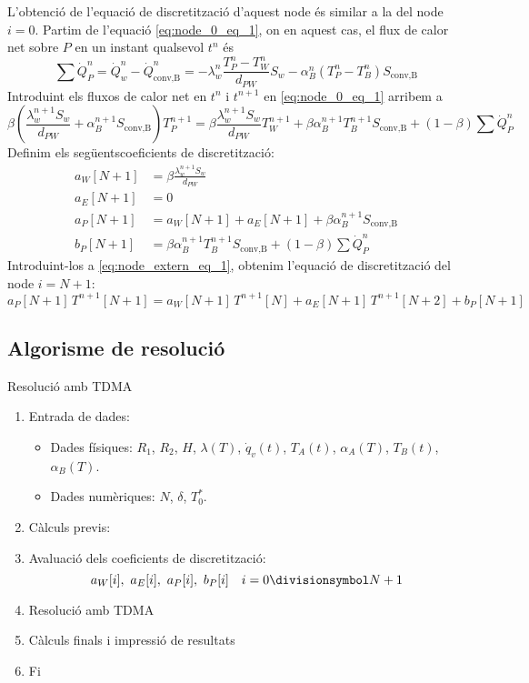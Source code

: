 L'obtenció de l'equació de discretització d'aquest node és similar a la del node $i = 0$. Partim de l'equació \eqref{eq:node_0_eq_1}, on en aquest cas, el flux de calor net sobre $P$ en un instant qualsevol $t^n$ és
\begin{equation} \label{eq:node_extern_fluxe_calor}
	\sum \dot{Q}_P^n = 
	\dot{Q}_w^n - \dot{Q}_\text{conv,B}^n = 
	-\lambda_w^n \frac{T_P^n - T_W^n}{d_{PW}} S_w - \alpha_B^n \left( T_P^n - T_B^n \right) S_\text{conv,B}
\end{equation}
Introduint els fluxos de calor net en $t^{n}$ i $t^{n+1}$ en \eqref{eq:node_0_eq_1} arribem a
\begin{equation} \label{eq:node_extern_eq_1}
	\beta \left(\frac{\lambda_w^{n+1} S_w}{d_{PW}} + \alpha_B^{n+1} S_\text{conv,B} \right) T_P^{n+1} = 
	\beta \frac{\lambda_w^{n+1} S_w}{d_{PW}} T_W^{n+1} + 
	\beta \alpha_B^{n+1} T_B^{n+1} S_\text{conv,B} + 
	(1 - \beta) \sum \dot{Q}_P^n
\end{equation}
Definim els següentscoeficients de discretització:
\begin{align} 
	a_W[N+1] &= \beta \frac{\lambda_w^{n+1} S_w}{d_{PW}} 					\\
	a_E[N+1] &= 0 															\\
	a_P[N+1] &= a_W[N+1] + a_E[N+1] + \beta \alpha_B^{n+1} S_\text{conv,B}	\\
	b_P[N+1] &= \beta \alpha_B^{n+1} T_B^{n+1} S_\text{conv,B} + (1 - \beta) \sum \dot{Q}_P^n
\end{align}
Introduint-los a \ref{eq:node_extern_eq_1}, obtenim l'equació de discretització del node $i = N + 1$:
\begin{equation}
	a_P[N+1] \, T^{n+1}[N+1] = a_W[N+1] \, T^{n+1}[N] + a_E[N+1] \, T^{n+1}[N+2] + b_P[N+1]
\end{equation}

\subsection{Algorisme de resolució}

\begin{algorithm}[ht]
	\caption{Resolució amb TDMA}
	\begin{enumerate}[label=\textbf{\arabic*.}]
		\item Entrada de dades:
		\begin{itemize}
			\item Dades físiques: $R_1$, $R_2$, $H$, $\lambda(T)$, $\dot{q}_v(t)$, $T_A(t)$, $\alpha_A(T)$, $T_B(t)$, $\alpha_B(T)$.
			\item Dades numèriques: $N$, $\delta$, $T_0^\ast$.
		\end{itemize}
		\item Càlculs previs: 
		\item Avaluació dels coeficients de discretització:
		\[
		a_W[i], \ a_E[i], \ a_P[i], \ b_P[i] \quad i = 0 \divisionsymbol N+1
		\]
		\item Resolució amb TDMA
		\item Càlculs finals i impressió de resultats
		\item Fi
	\end{enumerate}
\end{algorithm}
